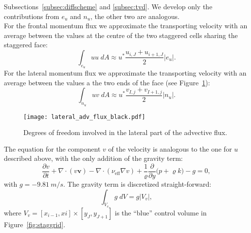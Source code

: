 \begin{itemize}
	Subsections~\ref{subsec:diffscheme} and \ref{subsec:tvd}. We develop only 
	the contributions from $e_u$ and $n_u$, the other two are 
	analogous.\\
	For the frontal momentum flux we approximate the transporting velocity with 
	an average between the values at the centre of the two staggered cells 
	sharing the staggered face:
	\begin{equation}
		\int_{e_u} u u \; dA \approx u^* \frac{u_{i,J} + 
		u_{i+1,J}}{2}|e_u|.
	\end{equation}
	For the lateral momentum flux we approximate the transporting velocity with 
	an average between the values a the two ends of the face (see 
	Figure~\ref{fig:lat_adv_flux}):
	\begin{equation}
	\int_{n_u} u v \; dA \approx u^* \frac{v_{I,j} 
	+v_{I+1,j}}{2} |n_u|.
	\end{equation}
	\begin{figure}
		\centering
		\texttt{[image: lateral\_adv\_flux\_black.pdf]}
		\caption[Degrees of freedom involved in the lateral part of the 
		advective flux]{Degrees of freedom involved in the lateral part of the 
		advective flux.}
		\label{fig:lat_adv_flux}
	\end{figure}
\end{itemize}
The equation for the component $v$ of the velocity is analogous to the one for 
$u$ described above, with the only addition of the gravity term:
\begin{equation}
\frac{\partial v}{\partial t} + \nabla \cdot (v \mathbf{v}) - \nabla \cdot 
(\nu_\text{eff} \nabla v) + \frac{1}{\varrho}\frac{\partial}{\partial y} \big(p 
+ \varrho k\big) - g= 0,
\end{equation}
with $g = \SI{-9.81}{m/s}$. The gravity term is discretized straight-forward:
\begin{equation}
\int_{V_v} g \; dV = g |V_v|,
\end{equation}
where $V_v = [x_{i-1}, xi] \times [y_J, y_{J+1}]$ is the ``blue'' control 
volume in Figure~\ref{fig:staggrid}.
%
